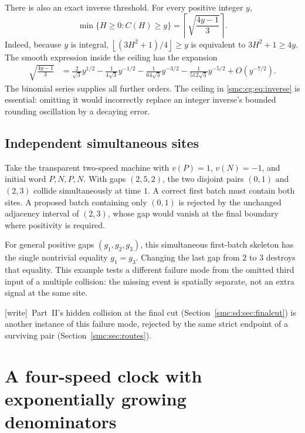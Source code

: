 \documentclass[11pt,letterpaper]{article}
\numberwithin{equation}{section}
\theoremstyle{definition}
\theoremstyle{remark}
\newcommand{\ceil}[1]{\left\lceil #1\right\rceil}
\newcommand{\floor}[1]{\left\lfloor #1\right\rfloor}
\newcommand{\wtag}{\textup{[write]}}
\begin{document}
There is also an exact inverse threshold. For every positive integer $y$,
\begin{equation}
 \min\{H\ge0:C(H)\ge y\}
 =\ceil{\sqrt{\frac{4y-1}{3}}}.
 \label{smc:cg:eq:inverse}
\end{equation}
Indeed, because $y$ is integral,
$\floor{(3H^2+1)/4}\ge y$ is equivalent to $3H^2+1\ge4y$.
The smooth expression inside the ceiling has the expansion
\begin{align}
 \sqrt{\frac{4y-1}{3}}
 &=\frac{2}{\sqrt3}y^{1/2}
 -\frac{1}{4\sqrt3}y^{-1/2}
 -\frac{1}{64\sqrt3}y^{-3/2}
 -\frac{1}{512\sqrt3}y^{-5/2}
 +O(y^{-7/2}).
 \label{smc:cg:eq:inverseasymptotic}
\end{align}
The binomial series supplies all further orders. The ceiling in
\eqref{smc:cg:eq:inverse} is essential: omitting it would incorrectly replace an
integer inverse's bounded rounding oscillation by a decaying error.

\subsection{Independent simultaneous sites}\label{smc:cg:sec:simultaneous}

Take the transparent two-speed machine with $v(P)=1$, $v(N)=-1$, and initial
word $P,N,P,N$. With gaps $(2,5,2)$, the two disjoint pairs $(0,1)$ and
$(2,3)$ collide simultaneously at time $1$. A correct first batch must
contain both sites. A proposed batch containing only $(0,1)$ is rejected by
the unchanged adjacency interval of $(2,3)$, whose gap would vanish at the
final boundary where positivity is required.

For general positive gaps $(g_1,g_2,g_3)$, this simultaneous first-batch
skeleton has the single nontrivial equality $g_1=g_3$. Changing the last gap
from $2$ to $3$ destroys that equality. This example tests a different
failure mode from the omitted third input of a multiple collision: the
missing event is spatially separate, not an extra signal at the same site.

\wtag\ Part~II's hidden collision at the final cut (Section~\ref{smc:sd:sec:finalcut}) is another instance of this failure mode, rejected by the same strict endpoint of a surviving pair (Section~\ref{smc:sec:routes}).

\section{A four-speed clock with exponentially growing denominators}
\label{smc:cg:sec:clock}
\end{document}
